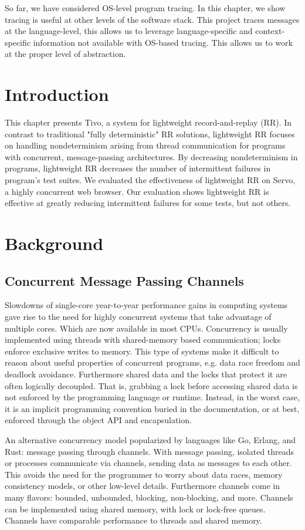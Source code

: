 So far, we have considered OS-level program tracing. In this chapter, we show tracing is useful at other levels of the software stack. This project traces messages at the language-level, this allows us to leverage language-specific and context-specific information not available with OS-based tracing. This allows us to work at the proper level of abstraction.

\section{Introduction}
This chapter presents Tivo, a system for lightweight record-and-replay (RR). In contrast to traditional "fully deterministic" RR solutions, lightweight RR focuses on handling nondeterminism arising from thread communication for programs with concurrent, message-passing architectures. By decreasing nondeterminism in programs, lightweight RR decreases the number of intermittent failures in program's test suites. We evaluated the effectiveness of lightweight RR on Servo, a highly concurrent web browser. Our evaluation shows lightweight RR is effective at greatly reducing intermittent failures for some tests, but not others.

\section{Background}
\subsection{Concurrent Message Passing Channels}
Slowdowns of single-core year-to-year performance gains in computing systems gave rise to the need for highly concurrent systems that take advantage of multiple cores. Which are now available
in most CPUs. Concurrency is usually implemented using threads with shared-memory based communication; locks enforce exclusive writes to memory. This type of systems make it difficult to reason about useful properties of concurrent programs, e.g. data race freedom and deadlock avoidance. Furthermore shared data and the locks that protect it are often logically decoupled. That is, grabbing a lock before accessing shared data is not enforced by the programming language or runtime. Instead, in the worst case, it is an implicit programming convention buried in the documentation, or at best, enforced through the object API and encapsulation.

An alternative concurrency model popularized by languages like Go, Erlang, and Rust: message passing through channels. With message passing, isolated threads or processes communicate via channels, sending data as messages to each other. This avoids the need for the programmer to worry about data races, memory consistency models, or other low-level details. Furthermore channels come in many flavors: bounded, unbounded, blocking, non-blocking, and more. Channels can be implemented using
shared memory, with lock or lock-free queues. Channels have comparable performance to threads and shared memory.

